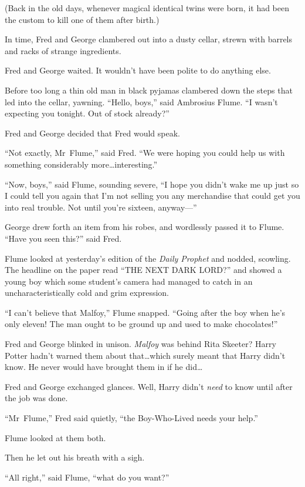 (Back in the old days, whenever magical identical twins were born, it had been the custom to kill one of them after birth.)

In time, Fred and George clambered out into a dusty cellar, strewn with barrels and racks of strange ingredients.

Fred and George waited. It wouldn’t have been polite to do anything else.

Before too long a thin old man in black pyjamas clambered down the steps that led into the cellar, yawning. “Hello, boys,” said Ambrosius Flume. “I wasn’t expecting you tonight. Out of stock already?”

Fred and George decided that Fred would speak.

“Not exactly, Mr~Flume,” said Fred. “We were hoping you could help us with something considerably more…interesting.”

“Now, boys,” said Flume, sounding severe, “I hope you didn’t wake me up just so I could tell you again that I’m not selling you any merchandise that could get you into real trouble. Not until you’re sixteen, anyway—”

George drew forth an item from his robes, and wordlessly passed it to Flume. “Have you seen this?” said Fred.

Flume looked at yesterday’s edition of the \emph{Daily Prophet} and nodded, scowling. The headline on the paper read “THE NEXT DARK LORD?” and showed a young boy which some student’s camera had managed to catch in an uncharacteristically cold and grim expression.

“I can’t believe that Malfoy,” Flume snapped. “Going after the boy when he’s only eleven! The man ought to be ground up and used to make chocolates!”

Fred and George blinked in unison. \emph{Malfoy} was behind Rita Skeeter? Harry Potter hadn’t warned them about that…which surely meant that Harry didn’t know. He never would have brought them in if he did…

Fred and George exchanged glances. Well, Harry didn’t \emph{need} to know until after the job was done.

“Mr~Flume,” Fred said quietly, “the Boy-Who-Lived needs your help.”

Flume looked at them both.

Then he let out his breath with a sigh.

“All right,” said Flume, “what do you want?”


